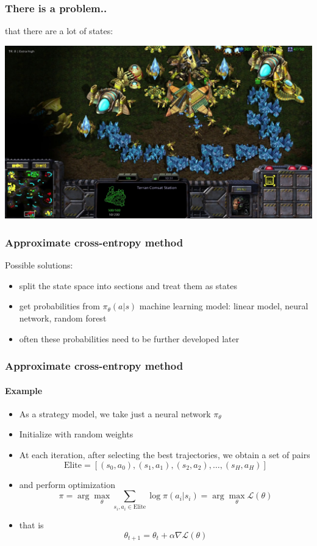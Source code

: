 \documentclass[fullscreen=true, bookmarks=true, hyperref={pdfencoding=unicode}]{beamer}
\begin{document}
\begin{frame}
  \frametitle{There is a problem..}

  \pause
  that there are a lot of states:
  \begin{center}
    \includegraphics[keepaspectratio,
                     width=.85\paperwidth]{starcraft3.jpg}
  \end{center}
\end{frame}


\begin{frame}
\frametitle{Approximate cross-entropy method}

    Possible solutions:
    \begin{itemize}
      \item split the state space into sections and treat them as states
      \pause
      \item get probabilities from $\pi_\theta (a | s)$ machine learning model: linear model, neural network, random forest
      \pause
      \item often these probabilities need to be further developed later
    \end{itemize}
\end{frame}


\begin{frame}
  \frametitle{Approximate cross-entropy method}
    \framesubtitle{Example}

   \begin{itemize}
     \pause
     \item As a strategy model, we take just a neural network $\pi_\theta$

     \pause
     \item Initialize with random weights

     \pause
     \item At each iteration, after selecting the best trajectories, we obtain a set of pairs
       $$\text{Elite} = [(s_0, a_0), (s_1, a_1), (s_2, a_2), \dots, (s_H, a_H )]$$

     \pause
     \item and perform optimization
       $$ \pi = \arg\max\limits_\theta \sum\limits_{s_i, a_i \in \text{Elite}} \log \pi(a_i|s_i) = \arg\max\limits_\theta \mathscr{ L}(\theta)$$

     \pause
     \item that is
       $$ \theta_{t+1} = \theta_{t} + \alpha \nabla \mathscr{L}(\theta) $$
   \end{itemize}
\end{frame}
\end{document}
